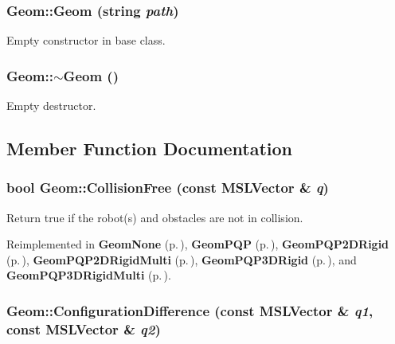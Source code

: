 \subsubsection{\setlength{\rightskip}{0pt plus 5cm}Geom::Geom (string {\em path})}\label{class_Geom_a0}


Empty constructor in base class.

\subsubsection{\setlength{\rightskip}{0pt plus 5cm}Geom::$\sim$Geom ()\hspace{0.3cm}{\tt  [inline, virtual]}}\label{class_Geom_a1}


Empty destructor.



\subsection{Member Function Documentation}
\subsubsection{\setlength{\rightskip}{0pt plus 5cm}bool Geom::Collision\-Free (const {\bf MSLVector} \& {\em q})\hspace{0.3cm}{\tt  [pure virtual]}}\label{class_Geom_a2}


Return true if the robot(s) and obstacles are not in collision.



Reimplemented in {\bf Geom\-None} {\rm (p.\,\pageref{class_GeomNone_a2})}, {\bf Geom\-PQP} {\rm (p.\,\pageref{class_GeomPQP_a4})}, {\bf Geom\-PQP2DRigid} {\rm (p.\,\pageref{class_GeomPQP2DRigid_a2})}, {\bf Geom\-PQP2DRigid\-Multi} {\rm (p.\,\pageref{class_GeomPQP2DRigidMulti_a2})}, {\bf Geom\-PQP3DRigid} {\rm (p.\,\pageref{class_GeomPQP3DRigid_a2})}, and {\bf Geom\-PQP3DRigid\-Multi} {\rm (p.\,\pageref{class_GeomPQP3DRigidMulti_a2})}.
\subsubsection{ Geom::Configuration\-Difference (const {\bf MSLVector} \& {\em q1}, const {\bf MSLVector} \& {\em q2})\hspace{0.3cm}{\tt  [virtual]}}\label{class_Geom_a4}


